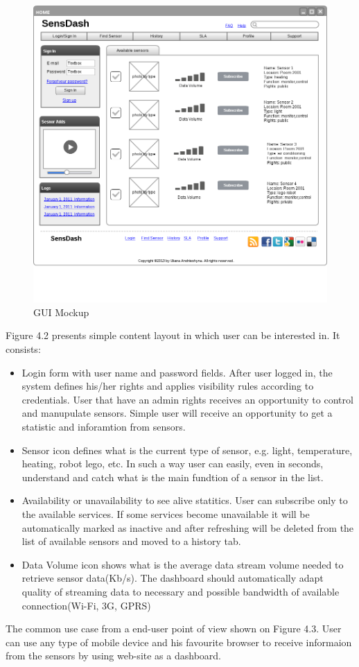     \begin{figure}[!ht]
    \centering
    \includegraphics[scale=0.4]{images/Mockup.png}   
    \caption[GUI Mockup]{GUI Mockup}
    \label{img:GUI Mockup}                           
    \end{figure}
    Figure 4.2 presents simple content layout in which user can be interested in. It consists:
      \begin{itemize}
      \item Login form with user name and password fields. After user logged in, the system defines his/her rights and applies visibility rules according to credentials. User that have an admin rights receives an opportunity to control and manupulate sensors. Simple user will receive an opportunity to get a statistic and inforamtion from sensors.
      \item Sensor icon defines what is the current type of sensor, e.g. light, temperature, heating, robot lego, etc. In such a way user can easily, even in seconds, understand and catch what is the main fundtion of a sensor in the list.
      \item Availability or unavailability to see alive statitics. User can subscribe only to the available services. If some services become unavailable it will be automatically marked as inactive and after refreshing will be deleted from the list of available sensors and moved to a history tab.
      \item Data Volume icon shows what is the average data stream volume needed to retrieve sensor data(Kb/s). The dashboard should automatically adapt quality of streaming data to necessary and possible bandwidth of available connection(Wi-Fi, 3G, GPRS)
      \end{itemize}
    The common use case from a end-user point of view shown on Figure 4.3. User can use any type of mobile device and his favourite browser to receive informaion from the sensors by using web-site as a dashboard.

